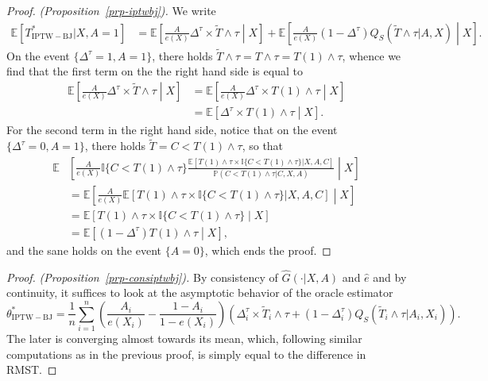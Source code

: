 \documentclass[
  11pt,
  a4paper,
]{article}
\theoremstyle{plain}
\theoremstyle{plain}
\theoremstyle{plain}
\theoremstyle{definition}
\theoremstyle{remark}
\begin{document}
\begin{proof}
\emph{(Proposition~\ref{prp-iptwbj}).} We write \[
\begin{aligned}
\mathbb{E}[ T^*_{\mathrm{IPTW-BJ}}|X,A=1] &= \mathbb{E}\left[\frac{A}{e(X)} \Delta^\tau \times \widetilde T \wedge \tau\middle|X\right] + \mathbb{E}\left[\frac{A}{e(X)} (1-\Delta^\tau) Q_S(\widetilde T \wedge \tau|A,X) \middle| X\right]. 
\end{aligned}
\] On the event \(\{\Delta^\tau=1, A=1\}\), there holds
\(\widetilde T \wedge \tau = T \wedge \tau = T(1) \wedge \tau\), whence
we find that the first term on the the right hand side is equal to \[
\begin{aligned}
\mathbb{E}\left[\frac{A}{e(X)} \Delta^\tau \times \widetilde T \wedge \tau\middle|X\right] &= \mathbb{E}\left[\frac{A}{e(X)} \Delta^\tau \times T(1) \wedge \tau\middle|X\right] \\
&= \mathbb{E}\left[\Delta^\tau \times T(1) \wedge \tau\middle|X\right].
\end{aligned}
\] For the second term in the right hand side, notice that on the event
\(\{\Delta^\tau=0, A=1\}\), there holds
\(\widetilde T = C < T(1) \wedge \tau\), so that \[
\begin{aligned}
\mathbb{E}&\left[\frac{A}{e(X)} \mathbb{I}\{C < T(1) \wedge \tau\} \frac{\mathbb{E}[T(1) \wedge \tau \times \mathbb{I}\{C < T(1) \wedge \tau\}|X,A,C]}{\mathbb{P}(C < T(1) \wedge \tau | C,X,A)} \middle| X\right] \\
&= \mathbb{E}\left[\frac{A}{e(X)} \mathbb{E}[T(1) \wedge \tau \times \mathbb{I}\{C < T(1) \wedge \tau\}|X,A,C] \middle| X\right] \\
&= \mathbb{E}\left[T(1) \wedge \tau \times \mathbb{I}\{C < T(1) \wedge \tau\} \middle| X\right] \\
&= \mathbb{E}\left[(1-\Delta^\tau) T(1) \wedge \tau  \middle| X\right], 
\end{aligned}
\] and the sane holds on the event \(\{A=0\}\), which ends the proof.
\end{proof}

\begin{proof}
\emph{(Proposition~\ref{prp-consiptwbj}).} By consistency of
\(\widehat G(\cdot|X,A)\) and \(\widehat e\) and by continuity, it
suffices to look at the asymptotic behavior of the oracle estimator \[
\theta^*_{\mathrm{IPTW-BJ}} = \frac1n\sum_{i=1}^n  \left(\frac{A_i}{ e(X_i)}-\frac{1-A_i}{1-e(X_i)} \right)\left(\Delta_i^\tau \times \widetilde T_i \wedge \tau + (1-\Delta_i^\tau) Q_S(\widetilde T_i \wedge \tau|A_i,X_i)\right).
\] The later is converging almost towards its mean, which, following
similar computations as in the previous proof, is simply equal to the
difference in RMST.
\end{proof}
\end{document}
